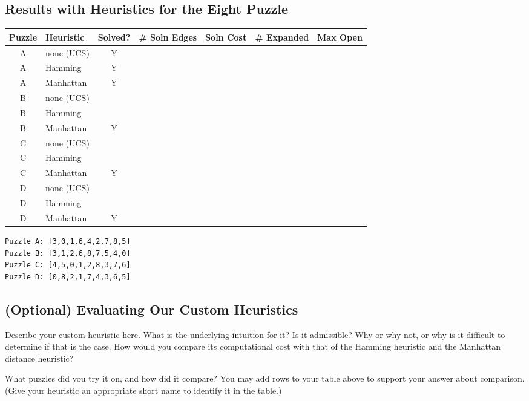\documentclass{article}
\begin{document}
\subsection{Results with Heuristics for the Eight Puzzle}

{\flushleft
\begin{tabular}{|c|l|c|l|c|c|c|}
\hline
Puzzle & Heuristic & Solved? & \# Soln Edges & Soln Cost & \# Expanded & Max Open\\
\hline
A & none (UCS) & Y & & & & \\
\hline
A & Hamming & Y & & & & \\
\hline
A & Manhattan & Y & & & & \\
\hline
B & none (UCS) & & & & & \\
\hline
B & Hamming &  & & & & \\
\hline
B & Manhattan & Y & & & & \\
\hline
C & none (UCS) & & & & & \\
\hline
C & Hamming &  & & & & \\
\hline
C & Manhattan & Y & & & & \\
\hline
D & none (UCS) & & & & & \\
\hline
D & Hamming &  & & & & \\
\hline
D & Manhattan & Y & & & & \\
\hline

\end{tabular} }

\begin{verbatim}
Puzzle A: [3,0,1,6,4,2,7,8,5]
Puzzle B: [3,1,2,6,8,7,5,4,0]
Puzzle C: [4,5,0,1,2,8,3,7,6]
Puzzle D: [0,8,2,1,7,4,3,6,5]
\end{verbatim}

\subsection{(Optional) Evaluating Our Custom Heuristics}

Describe your custom heuristic here.  What is the underlying intuition for it?
Is it admissible? Why or why not, or why is it difficult to determine if that
is the case.  How would you compare its computational cost with that of
the Hamming heuristic and the Manhattan distance heuristic?

What puzzles did you try it on, and how did it compare?
You may add rows to your table above to support your answer about comparison.
(Give your heuristic an appropriate short name to identify it in the table.)
\end{document}
